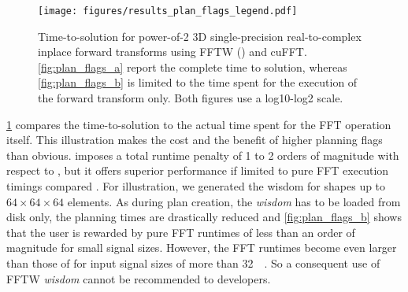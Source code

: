 \begin{figure}[!htbp]
  \centering
  \texttt{[image: figures/results\_plan\_flags\_legend.pdf]}\vspace{-1em}
  \hfill
  \caption{Time-to-solution for power-of-2 3D single-precision real-to-complex inplace forward transforms using FFTW () and cuFFT. \cref{fig:plan_flags_a} report the complete time to solution, whereas \cref{fig:plan_flags_b} is limited to the time spent for the execution of the forward transform only. Both figures use a log10-log2 scale.}
  \label{fig:fftw_plan_flags}
\end{figure}

\cref{fig:fftw_plan_flags} compares the time-to-solution to the actual time spent for the FFT operation itself. This illustration makes the cost and the benefit of higher planning flags than  obvious.  imposes a total runtime penalty of 1 to 2 orders of magnitude with respect to , but it offers superior performance if limited to pure FFT execution timings compared . For illustration, we generated the wisdom for shapes up to $64\times64\times64$ elements. As during plan creation, the \emph{wisdom} has to be loaded from disk only, the planning times are drastically reduced and \cref{fig:plan_flags_b} shows that the user is rewarded by pure FFT runtimes of less than an order of magnitude for small signal sizes. However, the FFT runtimes become even larger than those of  for input signal sizes of more than \SI{32}{\kibi\byte}. So a consequent use of FFTW \emph{wisdom} cannot be recommended to developers. 

